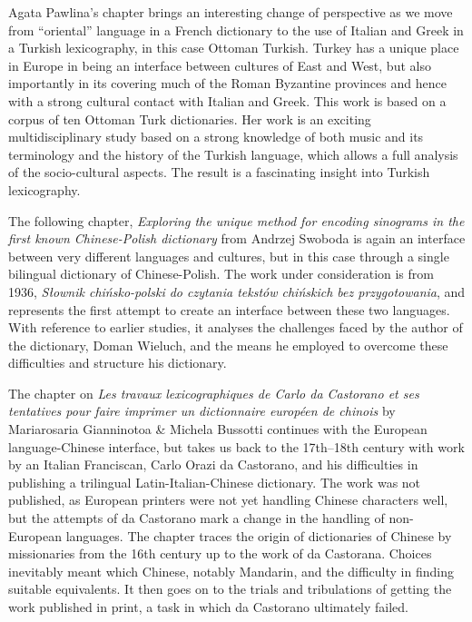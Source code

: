 \documentclass[output=paper]{langscibook}
\begin{document}
Agata Pawlina's chapter brings an interesting change of perspective as we move from “oriental” language in a French dictionary to the use of Italian and Greek in a Turkish lexicography, in this case Ottoman Turkish. Turkey has a unique place in Europe in being an interface between cultures of East and West, but also importantly in its covering much of the Roman Byzantine provinces and hence with a strong cultural contact with Italian and Greek. This work is based on a corpus of ten Ottoman Turk dictionaries. Her work is an exciting multidisciplinary study based on a strong knowledge of both music and its terminology and the history of the Turkish language, which allows a full analysis of the socio-cultural aspects. The result is a fascinating insight into Turkish lexicography.

The following chapter, \textit{Exploring the unique method for encoding sinograms in the first known Chinese-Polish dictionary} from Andrzej Swoboda is again an interface between very different languages and cultures, but in this case through a single bilingual dictionary of Chinese-Polish. The work under consideration is from 1936, \textit{Słownik chińsko-polski do czytania tekstów chińskich bez przygotowania}, and represents the first attempt to create an interface between these two languages. With reference to earlier studies, it analyses the challenges faced by the author of the dictionary, Doman Wieluch, and the means he employed to overcome these difficulties and structure his dictionary.

The chapter on \textit{Les travaux lexicographiques de Carlo da Castorano et ses tentatives pour faire imprimer un dictionnaire européen de chinois} by Mariarosaria Gianninotoa \& Michela Bussotti continues with the European language-Chinese interface, but takes us back to the 17th--18th century with work by an Italian Franciscan, Carlo Orazi da Castorano, and his difficulties in publishing a trilingual Latin-Italian-Chinese dictionary. The work was not published, as European printers were not yet handling  Chinese characters well, but the attempts of da Castorano mark a change in the handling of non-European languages. The chapter traces the origin of dictionaries of Chinese by missionaries from the 16th century up to the work of da Castorana. Choices inevitably meant which Chinese, notably Mandarin, and the difficulty in finding suitable equivalents. It then goes on to the trials and tribulations of getting the work published in print, a task in which da Castorano ultimately failed.
\end{document}
